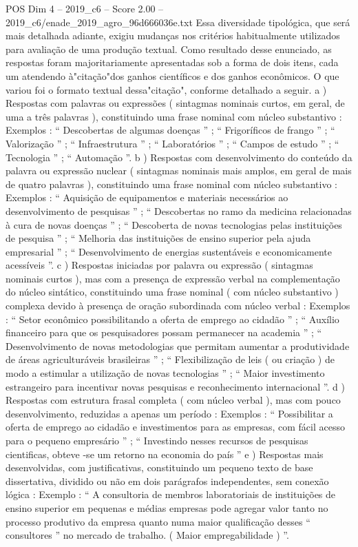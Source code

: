 \begin{textsample}{POS Dim 4 – 2019\_c6 – Score 2.00 – 2019\_c6/enade\_2019\_agro\_96d666036e.txt}
Essa diversidade tipológica, que será mais detalhada adiante, exigiu mudanças nos critérios habitualmente utilizados para avaliação de uma produção textual.
Como resultado desse enunciado, as respostas foram majoritariamente apresentadas sob a forma de dois itens, cada um atendendo à"citação"dos ganhos científicos e dos ganhos econômicos.
O que variou foi o formato textual dessa"citação", conforme detalhado a seguir. a ) Respostas com palavras ou expressões ( sintagmas nominais curtos, em geral, de uma a três palavras ), constituindo uma frase nominal com núcleo substantivo : Exemplos : “ Descobertas de algumas doenças ” ; “ Frigoríficos de frango ” ; “ Valorização ” ; “ Infraestrutura ” ; “ Laboratórios ” ; “ Campos de estudo ” ; “ Tecnologia ” ; “ Automação ”. b ) Respostas com desenvolvimento do conteúdo da palavra ou expressão nuclear ( sintagmas nominais mais amplos, em geral de mais de quatro palavras ), constituindo uma frase nominal com núcleo substantivo : Exemplos : “ Aquisição de equipamentos e materiais necessários ao desenvolvimento de pesquisas ” ; “ Descobertas no ramo da medicina relacionadas à cura de novas doenças ” ; “ Descoberta de novas tecnologias pelas instituições de pesquisa ” ; “ Melhoria das instituições de ensino superior pela ajuda empresarial ” ; “ Desenvolvimento de energias sustentáveis e economicamente acessíveis ”. c ) Respostas iniciadas por palavra ou expressão ( sintagmas nominais curtos ), mas com a presença de expressão verbal na complementação do núcleo sintático, constituindo uma frase nominal ( com núcleo substantivo ) complexa devido à presença de oração subordinada com núcleo verbal : Exemplos : “ Setor econômico possibilitando a oferta de emprego ao cidadão ” ; “ Auxílio financeiro para que os pesquisadores possam permanecer na academia ” ; “ Desenvolvimento de novas metodologias que permitam aumentar a produtividade de áreas agriculturáveis brasileiras ” ; “ Flexibilização de leis ( ou criação ) de modo a estimular a utilização de novas tecnologias ” ; “ Maior investimento estrangeiro para incentivar novas pesquisas e reconhecimento internacional ”. d ) Respostas com estrutura frasal completa ( com núcleo verbal ), mas com pouco desenvolvimento, reduzidas a apenas um período : Exemplos : “ Possibilitar a oferta de emprego ao cidadão e investimentos para as empresas, com fácil acesso para o pequeno empresário ” ; “ Investindo nesses recursos de pesquisas cientificas, obteve -se um retorno na economia do país ” e ) Respostas mais desenvolvidas, com justificativas, constituindo um pequeno texto de base dissertativa, dividido ou não em dois parágrafos independentes, sem conexão lógica : Exemplo : “ A consultoria de membros laboratoriais de instituições de ensino superior em pequenas e médias empresas pode agregar valor tanto no processo produtivo da empresa quanto numa maior qualificação desses “ consultores ” no mercado de trabalho. ( Maior empregabilidade ) ”.

\end{textsample}
